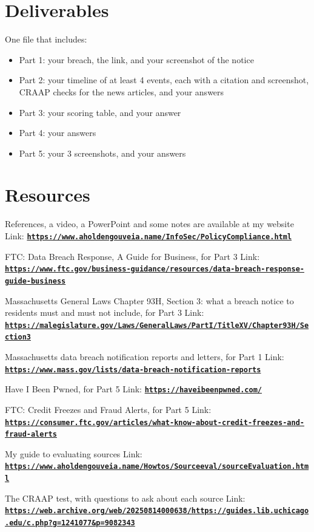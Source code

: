 \documentclass[12pt]{article}
\begin{document}
\section*{Deliverables}
One file that includes:
\begin{itemize}
    \item Part 1: your breach, the link, and your screenshot of the notice
    \item Part 2: your timeline of at least 4 events, each with a citation and screenshot, CRAAP checks for the news articles, and your answers
    \item Part 3: your scoring table, and your answer
    \item Part 4: your answers
    \item Part 5: your 3 screenshots, and your answers
\end{itemize}

\section*{Resources}
References, a video, a PowerPoint and some notes are available at my website
Link: \href{https://www.aholdengouveia.name/InfoSec/PolicyCompliance.html}{\textbf{\nolinkurl{https://www.aholdengouveia.name/InfoSec/PolicyCompliance.html}}}

FTC: Data Breach Response, A Guide for Business, for Part 3
Link: \href{https://www.ftc.gov/business-guidance/resources/data-breach-response-guide-business}{\textbf{\nolinkurl{https://www.ftc.gov/business-guidance/resources/data-breach-response-guide-business}}}

Massachusetts General Laws Chapter 93H, Section 3: what a breach notice to residents must and must not include, for Part 3
Link: \href{https://malegislature.gov/Laws/GeneralLaws/PartI/TitleXV/Chapter93H/Section3}{\textbf{\nolinkurl{https://malegislature.gov/Laws/GeneralLaws/PartI/TitleXV/Chapter93H/Section3}}}

Massachusetts data breach notification reports and letters, for Part 1
Link: \href{https://www.mass.gov/lists/data-breach-notification-reports}{\textbf{\nolinkurl{https://www.mass.gov/lists/data-breach-notification-reports}}}

Have I Been Pwned, for Part 5
Link: \href{https://haveibeenpwned.com/}{\textbf{\nolinkurl{https://haveibeenpwned.com/}}}

FTC: Credit Freezes and Fraud Alerts, for Part 5
Link: \href{https://consumer.ftc.gov/articles/what-know-about-credit-freezes-and-fraud-alerts}{\textbf{\nolinkurl{https://consumer.ftc.gov/articles/what-know-about-credit-freezes-and-fraud-alerts}}}

My guide to evaluating sources
Link: \href{https://www.aholdengouveia.name/Howtos/Sourceeval/sourceEvaluation.html}{\textbf{\nolinkurl{https://www.aholdengouveia.name/Howtos/Sourceeval/sourceEvaluation.html}}}

The CRAAP test, with questions to ask about each source
Link: \href{https://web.archive.org/web/20250814000638/https://guides.lib.uchicago.edu/c.php?g=1241077&p=9082343}{\textbf{\nolinkurl{https://web.archive.org/web/20250814000638/https://guides.lib.uchicago.edu/c.php?g=1241077&p=9082343}}}
\end{document}
